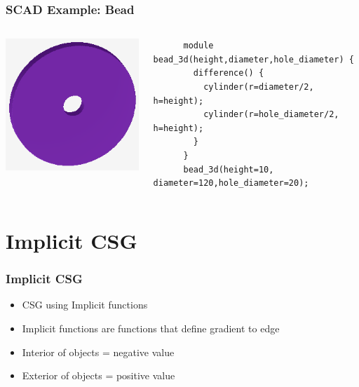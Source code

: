 \documentclass{beamer}
\begin{document}
\begin{frame}[fragile]
\frametitle{SCAD Example: Bead}
\lstset{basicstyle=\ttfamily\scriptsize}
\begin{columns}
  \begin{column}{0.2\textwidth}
    \includegraphics[width=1.0\textwidth, center]{bead_example.png}
  \end{column}
  \begin{column}{0.8\textwidth}
    \begin{lstlisting}
      module bead_3d(height,diameter,hole_diameter) {
        difference() {
          cylinder(r=diameter/2, h=height);
          cylinder(r=hole_diameter/2, h=height);
        }
      }
      bead_3d(height=10, diameter=120,hole_diameter=20);
    \end{lstlisting}
  \end{column}
\end{columns}
\end{frame}

\section{Implicit CSG}
\begin{frame}[fragile]
\frametitle{Implicit CSG}
\begin{itemize}
\item CSG using Implicit functions
\item Implicit functions are functions that define gradient to edge
\item Interior of objects = negative value
\item Exterior of objects = positive value
\end{itemize}
\end{frame}
\end{document}
